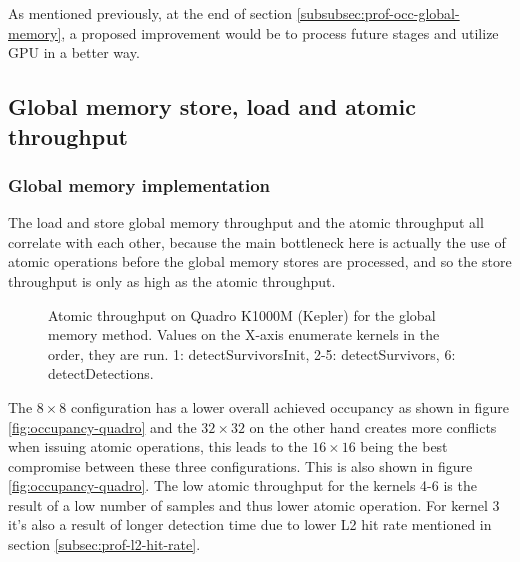As mentioned previously, at the end of section \ref{subsubsec:prof-occ-global-memory}, a proposed improvement would be to process future stages and utilize GPU in a better way.

\subsection{Global memory store, load and atomic throughput}\label{subsec:prof-throughput}

\subsubsection{Global memory implementation}\label{subsubsec:prof-thr-global-memory}

The load and store global memory throughput and the atomic throughput all correlate with each other, because the main bottleneck here is actually the use of atomic operations before the global memory stores are processed, and so the store throughput is only as high as the atomic throughput.

\begin{figure}[ht]
\centering{}
	\caption{Atomic throughput on Quadro K1000M (Kepler) for the global memory method. Values on the X-axis enumerate kernels in the order, they are run. 1: detectSurvivorsInit, 2-5: detectSurvivors, 6: detectDetections.}
	\label{fig:atomic-throughput-quadro}
\end{figure}

The $8 \times 8$ configuration has a lower overall achieved occupancy as shown in figure \ref{fig:occupancy-quadro} and the $32 \times 32$ on the other hand creates more conflicts when issuing atomic operations, this leads to the $16 \times 16$ being the best compromise between these three configurations. This is also shown in figure \ref{fig:occupancy-quadro}. The low atomic throughput for the kernels 4-6 is the result of a low number of samples and thus lower atomic operation. For kernel 3 it's also a result of longer detection time due to lower L2 hit rate mentioned in section \ref{subsec:prof-l2-hit-rate}.

